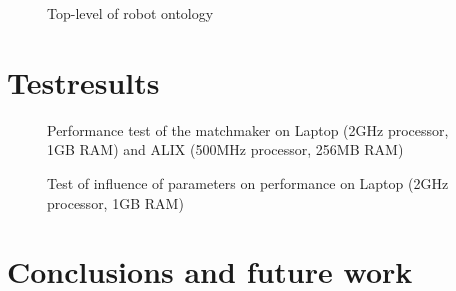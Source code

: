 \documentclass[9pt, twocolumn]{phdsymp} %
\begin{document}
\begin{figure}[htpb!]
\centering
\caption{Top-level of robot ontology}
\label{fig:ontology}
\end{figure}

\section{Testresults}

\begin{figure}[htpb!]
\centering
\caption{Performance test of the matchmaker on Laptop (2GHz processor, 1GB RAM) and ALIX (500MHz processor, 256MB RAM)}
\label{fig:testperformance}
\end{figure}


\begin{figure}[htpb!]
\centering
\caption{Test of influence of parameters on performance on Laptop (2GHz processor, 1GB RAM)}
\label{fig:testparameters}
\end{figure}



\section{Conclusions and future work}



\end{document}
